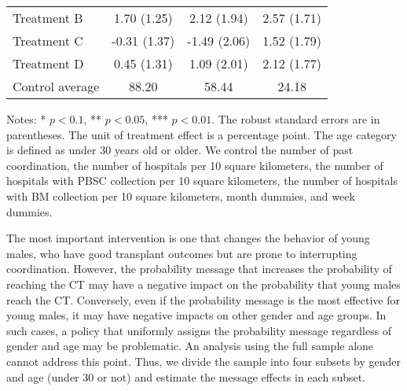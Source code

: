 \documentclass[12pt, a4paper]{article}
\begin{document}
\begin{table}
\begin{threeparttable}
\begin{tabular}[t]{lccc}
\hspace{1em}Treatment B & 1.70 (1.25) & 2.12 (1.94) & 2.57 (1.71)\\
\hspace{1em}Treatment C & -0.31 (1.37) & -1.49 (2.06) & 1.52 (1.79)\\
\hspace{1em}Treatment D & 0.45 (1.31) & 1.09 (2.01) & 2.12 (1.77)\\
\hspace{1em}Control average & 88.20 & 58.44 & 24.18\\
\bottomrule
\end{tabular}
\begin{tablenotes}
\item Notes: * $p < 0.1$, ** $p < 0.05$, *** $p < 0.01$. The robust standard errors are in parentheses. The unit of treatment effect is a percentage point. The age category is defined as under 30 years old or older. We control the number of past coordination, the number of hospitals per 10 square kilometers, the number of hospitals with PBSC collection per 10 square kilometers, the number of hospitals with BM collection per 10 square kilometers, month dummies, and week dummies.
\end{tablenotes}
\end{threeparttable}
\end{table}

The most important intervention is one that changes the behavior of young males, who have good transplant outcomes but are prone to interrupting coordination. However, the probability message that increases the probability of reaching the CT may have a negative impact on the probability that young males reach the CT. Conversely, even if the probability message is the most effective for young males, it may have negative impacts on other gender and age groups. In such cases, a policy that uniformly assigns the probability message regardless of gender and age may be problematic. An analysis using the full sample alone cannot address this point. Thus, we divide the sample into four subsets by gender and age (under 30 or not) and estimate the message effects in each subset.
\end{document}
